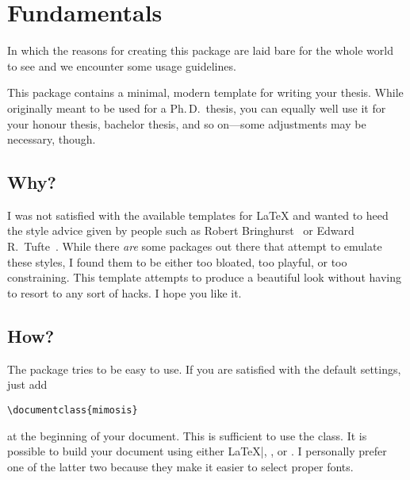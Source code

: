\chapter{Fundamentals}

\begin{center}
  \begin{minipage}{0.5\textwidth}
    \begin{small}
      In which the reasons for creating this package are laid bare for the
      whole world to see and we encounter some usage guidelines.
    \end{small}
  \end{minipage}
  \vspace{0.5cm}
\end{center}

\noindent This package contains a minimal, modern template for writing your
thesis. While originally meant to be used for a Ph.\,D.\ thesis, you can
equally well use it for your honour thesis, bachelor thesis, and so
on---some adjustments may be necessary, though.

\section{Why?}

I was not satisfied with the available templates for \LaTeX{} and wanted
to heed the style advice given by people such as Robert
Bringhurst~\cite{Bringhurst12} or Edward R.\
Tufte~\cite{Tufte90,Tufte01}. While there \emph{are} some packages out
there that attempt to emulate these styles, I found them to be either
too bloated, too playful, or too constraining. This template attempts to
produce a beautiful look without having to resort to any sort of hacks.
I hope you like it.

\section{How?}

The package tries to be easy to use. If you are satisfied with the
default settings, just add
%
\begin{verbatim}
\documentclass{mimosis}
\end{verbatim}
%
at the beginning of your document. This is sufficient to use the class.
It is possible to build your document using either \LaTeX|, \XeLaTeX, or
\LuaLaTeX. I personally prefer one of the latter two because they make
it easier to select proper fonts.

